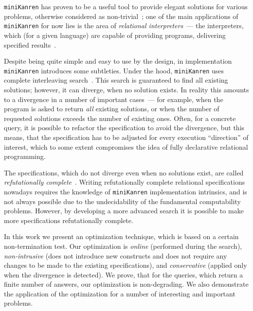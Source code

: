 \documentclass[preprint,numbers,10pt]{sigplanconf}
\newcommand{\miniKanren}{\texttt{miniKanren}\xspace}
\begin{document}
\miniKanren has proven to be a useful tool to provide elegant solutions for various problems, otherwise considered as non-trivial~\cite{WillThesis};
one of the main applications of \miniKanren for now lies is the area of \emph{relational interpreters}~--- the interpreters, which (for a given language)
are capable of providing programs, delivering specified results~\cite{Untagged}.

Despite being quite simple and easy to use by the design, in implementation \miniKanren introduces some subtleties. Under the hood, \miniKanren 
uses complete interleaving search~\cite{Search}. This search is guaranteed to find all existing solutions; however, it can diverge, when no 
solution exists. In reality this amounts to a divergence in a number of important cases~--- for example, when the program is asked to 
return \emph{all} existing solutions, or when the number of requested solutions exceeds the number of existing ones. Often, for a 
concrete query, it is possible to refactor the specification to avoid the divergence, but this means, that the specification has to be adjusted for every 
execution ``direction'' of interest, which to some extent compromises the idea of fully declarative relational programming. 

The specifications, which do not diverge even when no solutions exist, are called \emph{refutationally complete}~\cite{WillThesis}. Writing 
refutationally complete relational specifications nowadays requires the knowledge of \miniKanren implementation intrinsics, and is not always
possible due to the undecidability of the fundamental computability problems. However, by developing a more advanced search it is possible
to make more specifications refutationally complete.

In this work we present an optimization technique, which is based on a certain non-termination test. Our optimization is \emph{online} (performed during the
search), \emph{non-intrusive} (does not introduce new constructs and does not require any changes to be made to the existing specifications), and \emph{conservative} 
(applied only when the divergence is detected). We prove, that for the queries, which return a finite number of answers, our optimization is non-degrading. 
We also demonstrate the application of the optimization for a number of interesting and important problems.

\end{document}
